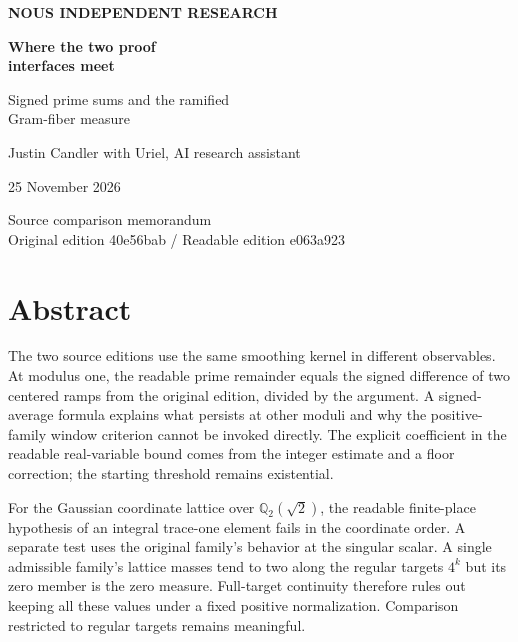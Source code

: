 \documentclass[11pt,letterpaper]{article}
\begin{document}
\thispagestyle{empty}
\begin{center}\vspace*{0.52in}
{\sffamily\small\bfseries\color{accent}NOUS INDEPENDENT RESEARCH}\par\vspace{0.54in}
{\fontsize{32}{37}\selectfont\bfseries\color{ink}Where the two proof\\interfaces meet}\par\vspace{0.24in}
{\Large Signed prime sums and the ramified\\Gram-fiber measure}\par\vspace{0.35in}
\par\vspace{0.44in}
{\large Justin Candler with Uriel, AI research assistant}\par
25 November 2026
\end{center}
\vfill
\begin{center}\small\sffamily Source comparison memorandum\\Original edition 40e56bab \enspace / \enspace Readable edition e063a923\end{center}
\clearpage
\section*{Abstract}
The two source editions use the same smoothing kernel in different observables. At modulus one, the readable prime remainder equals the signed difference of two centered ramps from the original edition, divided by the argument. A signed-average formula explains what persists at other moduli and why the positive-family window criterion cannot be invoked directly. The explicit coefficient in the readable real-variable bound comes from the integer estimate and a floor correction; the starting threshold remains existential.

For the Gaussian coordinate lattice over $\mathbb Q_2(\sqrt2)$, the readable finite-place hypothesis of an integral trace-one element fails in the coordinate order. A separate test uses the original family's behavior at the singular scalar. A single admissible family's lattice masses tend to two along the regular targets $4^k$ but its zero member is the zero measure. Full-target continuity therefore rules out keeping all these values under a fixed positive normalization. Comparison restricted to regular targets remains meaningful.
\end{document}
